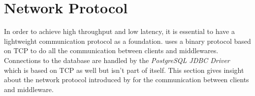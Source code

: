 \documentclass[a4paper, oneside]{csthesis}
\begin{document}
\begin{table}[hp]
\begin{adjustbox}{center}
    \end{adjustbox}
    \caption{Parameters of a message query}
    \label{tbl:procedures}
\end{table}

\section{Network Protocol}
\label{sec:protocol}

    In order to achieve high throughput and low latency, it is essential to have
    a lightweight communication protocol as a foundation. \telesto{} uses a binary
    protocol based on TCP to do all the communication between clients and
    middlewares. Connections to the database are handled by the {\it PostgreSQL
    JDBC Driver}~ which is based on
    TCP as well but isn't part of \telesto{} itself. This section gives insight
    about the network protocol introduced by \telesto{} for the communication
    between clients and middleware.
    
\end{document}
